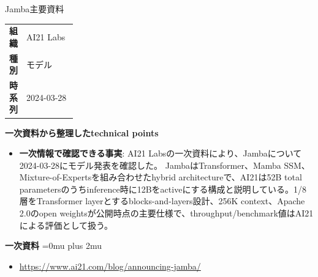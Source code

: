 \Needspace{0.38\textheight}
\begin{technicalnote}{Jamba}{主要資料}
\begingroup
\begin{tabularx}{\linewidth}{@{}>{\bfseries}p{0.22\linewidth}X@{}}
組織 & AI21 Labs \\
種別 & モデル \\
時系列 & 2024-03-28 \\
\end{tabularx}
\smallskip
\begin{minipage}{\linewidth}
{\bfseries 一次資料から整理したtechnical points}
\begin{itemize}[leftmargin=1.5em,itemsep=0.35em]
\item \textbf{一次情報で確認できる事実}: AI21 Labsの一次資料により、Jambaについて2024-03-28にモデル発表を確認した。 JambaはTransformer、Mamba SSM、Mixture-of-Expertsを組み合わせたhybrid architectureで、AI21は52B total parametersのうちinference時に12Bをactiveにする構成と説明している。1/8層をTransformer layerとするblocks-and-layers設計、256K context、Apache 2.0のopen weightsが公開時点の主要仕様で、throughput/benchmark値はAI21による評価として扱う。
\end{itemize}
\begin{minipage}{\linewidth}
\begin{samepage}
{\bfseries 一次資料}
\begingroup\sloppy
\Urlmuskip=0mu plus 2mu\relax
\begin{itemize}[leftmargin=1.5em,itemsep=0.25em]
\item {\scriptsize\url{https://www.ai21.com/blog/announcing-jamba/}}
\end{itemize}
\endgroup
\end{samepage}
\end{minipage}
\end{minipage}
\endgroup
\end{technicalnote}
\medskip

